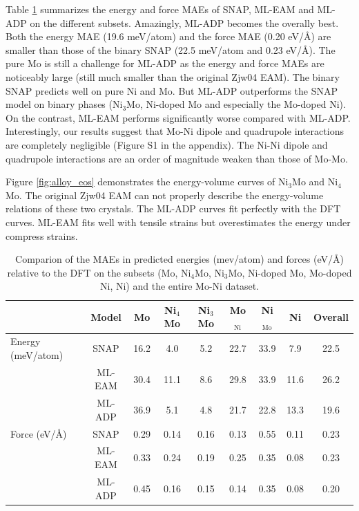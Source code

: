 \documentclass[prb,reprint]{revtex4-2}
\begin{document}
Table \ref{table:MAE} summarizes the energy and force MAEs of SNAP, ML-EAM and 
ML-ADP on the different subsets. Amazingly, ML-ADP becomes the overally best. 
Both the energy MAE (19.6 meV/atom) and the force MAE (0.20 eV/\AA) are smaller 
than those of the binary SNAP (22.5 meV/atom and 0.23 eV/\AA). 
The pure Mo is still a challenge for ML-ADP as the energy and force MAEs are 
noticeably large (still much smaller than the original Zjw04 EAM). The binary 
SNAP predicts well on pure Ni and Mo. But ML-ADP outperforms the SNAP model on 
binary phases (Ni$_3$Mo, Ni-doped Mo and especially the Mo-doped Ni).
On the contrast, ML-EAM performs significantly worse compared with ML-ADP. 
Interestingly, our results suggest that Mo-Ni dipole and quadrupole interactions 
are completely negligible (Figure S1 in the appendix). The Ni-Ni dipole and 
quadrupole interactions are an order of magnitude weaken than those of Mo-Mo. 

Figure \ref{fig:alloy_eos} demonstrates the energy-volume curves of Ni$_3$Mo and
Ni$_4$Mo. The original Zjw04 EAM can not properly describe the energy-volume 
relations of these two crystals. The ML-ADP curves fit perfectly with the DFT 
curves. ML-EAM fits well with tensile strains but overestimates the energy under 
compress strains. 

% 
%
\begin{table}
\centering
\begin{tabular}{lcccccccc}
\hline
                  & Model            & Mo   & Ni$_4$Mo & Ni$_3$Mo & Mo$_{\mathrm{Ni}}$ & Ni$_{\mathrm{Mo}}$ & Ni   & Overall \\
\hline
Energy (meV/atom) & SNAP \cite{SNAP} & 16.2 & 4.0      & 5.2      & 22.7               & 33.9               & 7.9  & 22.5    \\
                  & ML-EAM           & 30.4 & 11.1     & 8.6      & 29.8               & 33.9               & 11.6 & 26.2    \\
                  & ML-ADP           & 36.9 & 5.1      & 4.8      & 21.7               & 22.8               & 13.3 & 19.6    \\
\hline
Force (eV/\AA)    & SNAP \cite{SNAP} & 0.29 & 0.14     & 0.16     & 0.13               & 0.55               & 0.11 & 0.23    \\
                  & ML-EAM           & 0.33 & 0.24     & 0.19     & 0.25               & 0.35               & 0.08 & 0.23    \\
                  & ML-ADP           & 0.45 & 0.16     & 0.15     & 0.14               & 0.35               & 0.08 & 0.20    \\
\hline
\end{tabular}
\caption{\label{table:MAE}
Comparion of the MAEs in predicted energies (mev/atom) and forces (eV/\AA) 
relative to the DFT on the subsets (Mo, Ni$_4$Mo, Ni$_3$Mo, Ni-doped Mo, 
Mo-doped Ni, Ni) and the entire Mo-Ni dataset.}
\end{table}
\end{document}
